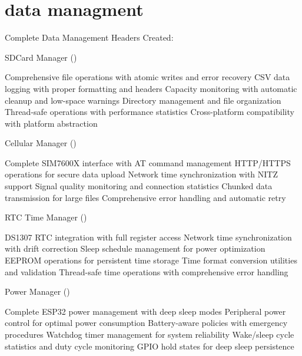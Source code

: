 \chapter{data managment }
\hypertarget{md_data_01managment}{}\label{md_data_01managment}
Complete Data Management Headers Created\+:
\begin{DoxyEnumerate}
\item SDCard Manager ()
\end{DoxyEnumerate}

Comprehensive file operations with atomic writes and error recovery CSV data logging with proper formatting and headers Capacity monitoring with automatic cleanup and low-\/space warnings Directory management and file organization Thread-\/safe operations with performance statistics Cross-\/platform compatibility with platform abstraction


\begin{DoxyEnumerate}
\item Cellular Manager ()
\end{DoxyEnumerate}

Complete SIM7600X interface with AT command management HTTP/\+HTTPS operations for secure data upload Network time synchronization with NITZ support Signal quality monitoring and connection statistics Chunked data transmission for large files Comprehensive error handling and automatic retry


\begin{DoxyEnumerate}
\item RTC Time Manager ()
\end{DoxyEnumerate}

DS1307 RTC integration with full register access Network time synchronization with drift correction Sleep schedule management for power optimization EEPROM operations for persistent time storage Time format conversion utilities and validation Thread-\/safe time operations with comprehensive error handling


\begin{DoxyEnumerate}
\item Power Manager ()
\end{DoxyEnumerate}

Complete ESP32 power management with deep sleep modes Peripheral power control for optimal power consumption Battery-\/aware policies with emergency procedures Watchdog timer management for system reliability Wake/sleep cycle statistics and duty cycle monitoring GPIO hold states for deep sleep persistence

